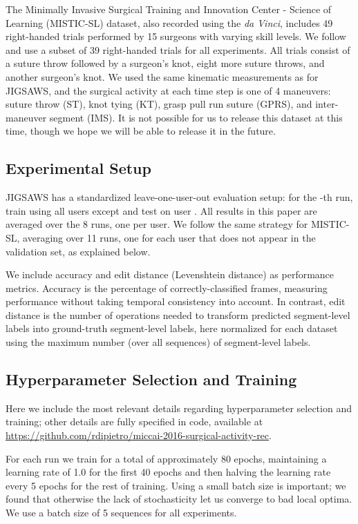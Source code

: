 \documentclass{llncs}
\begin{document}
The Minimally Invasive Surgical Training and Innovation Center - Science of Learning (MISTIC-SL) dataset, also recorded using the \emph{da Vinci}, includes 49 right-handed trials performed by 15 surgeons with varying skill levels. We follow \cite{gao2016unsupervised} and use a subset of 39 right-handed trials for all experiments. All trials consist of a suture throw followed by a surgeon's knot, eight more suture throws, and another surgeon's knot. We used the same kinematic measurements as for JIGSAWS, and the surgical activity at each time step is one of 4 maneuvers: suture throw (ST), knot tying (KT), grasp pull run suture (GPRS), and inter-maneuver segment (IMS). It is not possible for us to release this dataset at this time, though we hope we will be able to release it in the future.

\subsection{Experimental Setup}

JIGSAWS has a standardized leave-one-user-out evaluation setup: for the -th run, train using all users except  and test on user . All results in this paper are averaged over the 8 runs, one per user. We follow the same strategy for MISTIC-SL, averaging over 11 runs, one for each user that does not appear in the validation set, as explained below.

We include accuracy and edit distance (Levenshtein distance) as performance metrics. Accuracy is the percentage of correctly-classified frames, measuring performance without taking temporal consistency into account. In contrast, edit distance is the number of operations needed to transform predicted segment-level labels into ground-truth segment-level labels, here normalized for each dataset using the maximum number (over all sequences) of segment-level labels.

\subsection{Hyperparameter Selection and Training}

Here we include the most relevant details regarding hyperparameter selection and training; other details are fully specified in code, available at\\ \url{https://github.com/rdipietro/miccai-2016-surgical-activity-rec}.

For each run we train for a total of approximately 80 epochs, maintaining a learning rate of 1.0 for the first 40 epochs and then halving the learning rate every 5 epochs for the rest of training. Using a small batch size is important; we found that otherwise the lack of stochasticity let us converge to bad local optima. We use a batch size of 5 sequences for all experiments.
\end{document}
